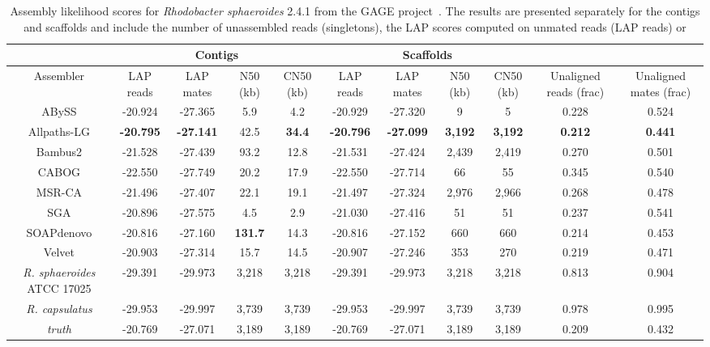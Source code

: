 \begin{landscape}
\renewcommand{\baselinestretch}{1}
\small\normalsize
\begin{table}[tb!]
\centering
\tiny
\begin{tabular}{|c|c|c|c|c|c|c|c|c|c|c|}
\hline
 & \multicolumn{4}{c|}{Contigs} & \multicolumn{4}{c|}{Scaffolds} & & \\
\hline
Assembler & LAP reads & LAP mates & N50 (kb) & CN50 (kb) & LAP reads & LAP mates & N50 (kb) & CN50 (kb) & Unaligned reads (frac) & Unaligned mates (frac) \\
\hline
ABySS & -20.924 & -27.365 & 5.9 & 4.2 & -20.929 & -27.320 & 9 & 5 & 0.228 & 0.524\\
Allpaths-LG & {\bf -20.795} & {\bf -27.141} & 42.5 & {\bf 34.4} & {\bf -20.796} & {\bf -27.099} & {\bf 3,192} & {\bf 3,192} & {\bf 0.212} & {\bf 0.441} \\
Bambus2 & -21.528 & -27.439 & 93.2 & 12.8 & -21.531 & -27.424 & 2,439 & 2,419 & 0.270 & 0.501\\
CABOG & -22.550 & -27.749 & 20.2 & 17.9 & -22.550 & -27.714 & 66 & 55 & 0.345 & 0.540\\
MSR-CA & -21.496 & -27.407 & 22.1 & 19.1 & -21.497 & -27.324 & 2,976 & 2,966 & 0.268 & 0.478\\
SGA & -20.896 & -27.575 & 4.5 & 2.9 & -21.030 & -27.416 & 51 & 51 & 0.237 & 0.541 \\
SOAPdenovo & -20.816 & -27.160 & {\bf 131.7} & 14.3 & -20.816 & -27.152 & 660 & 660 & 0.214 & 0.453\\
Velvet & -20.903 & -27.314 & 15.7 & 14.5 & -20.907 & -27.246 & 353 & 270 & 0.219 & 0.471\\
\emph{R. sphaeroides} ATCC 17025 & -29.391 & -29.973 & 3,218 & 3,218 & -29.391 & -29.973 & 3,218 & 3,218 & 0.813 & 0.904\\
\emph{R. capsulatus} & -29.953 & -29.997 & 3,739 & 3,739 & -29.953 & -29.997 & 3,739 & 3,739 & 0.978 & 0.995\\
\emph{truth} & -20.769 & -27.071 & 3,189 & 3,189 & -20.769 & -27.071 & 3,189 & 3,189 & 0.209 & 0.432\\
\hline
\end{tabular}
\caption[\emph{Rhodobacter sphaeroides} 2.4.1 assembly evaluation]{Assembly likelihood scores for \emph{Rhodobacter sphaeroides} 2.4.1 from the GAGE project~\cite{earl2011assemblathon}.  The results are presented
separately for the contigs and scaffolds and include the number of
unassembled reads (singletons), the LAP scores computed on unmated reads (LAP reads) or
}
\end{table}
\end{landscape}
